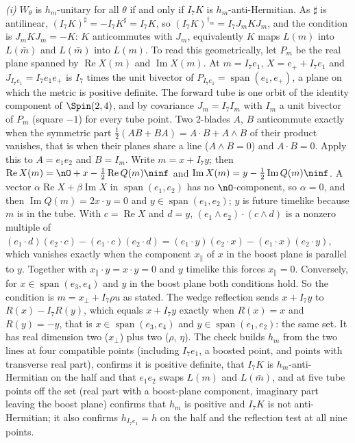 \emph{(i)} $W_{\theta}$ is $h_{m}$-unitary for all $\theta$ if and only if $I_{7}K$ is $h_{m}$-anti-Hermitian. As $\sharp$ is antilinear, $(I_{7}K)^{\sharp} = -I_{7}K^{\sharp} = I_{7}K$, so $(I_{7}K)^{\dagger_{m}} = I_{7}J_{m}KJ_{m}$, and the condition is $J_{m}KJ_{m} = -K$: $K$ anticommutes with $J_{m}$, equivalently $K$ maps $L(m)$ into $L(\bar m)$ and $L(\bar m)$ into $L(m)$.
To read this geometrically, let $P_{m}$ be the real plane spanned by $\operatorname{Re}X(m)$ and $\operatorname{Im}X(m)$. At $m = I_{7}e_{1}$, $X = e_{+} + I_{7}e_{1}$ and $J_{I_{7}e_{1}} = I_{7}e_{1}e_{+}$ is $I_{7}$ times the unit bivector of $P_{I_{7}e_{1}} = \operatorname{span}(e_{1}, e_{+})$, a plane on which the metric is positive definite. The forward tube is one orbit of the identity component of $\Spin(2,4)$, and by covariance $J_{m} = I_{7}I_{m}$ with $I_{m}$ a unit bivector of $P_{m}$ (square $-1$) for every tube point. Two 2-blades $A$, $B$ anticommute exactly when the symmetric part $\tfrac12(AB + BA) = A \cdot B + A \wedge B$ of their product vanishes, that is when their planes share a line ($A \wedge B = 0$) and $A \cdot B = 0$. Apply this to $A = e_{1}e_{2}$ and $B = I_{m}$. Write $m = x + I_{7}y$; then $\operatorname{Re}X(m) = \nO + x - \tfrac12\operatorname{Re}Q(m)\ninf$ and $\operatorname{Im}X(m) = y - \tfrac12\operatorname{Im}Q(m)\ninf$. A vector $\alpha\operatorname{Re}X + \beta\operatorname{Im}X$ in $\operatorname{span}(e_{1}, e_{2})$ has no $\nO$-component, so $\alpha = 0$, and then $\operatorname{Im}Q(m) = 2x \cdot y = 0$ and $y \in \operatorname{span}(e_{1}, e_{2})$; $y$ is future timelike because $m$ is in the tube. With $c = \operatorname{Re}X$ and $d = y$, $(e_{1} \wedge e_{2}) \cdot (c \wedge d)$ is a nonzero multiple of $(e_{1} \cdot d)(e_{2} \cdot c) - (e_{1} \cdot c)(e_{2} \cdot d) = (e_{1} \cdot y)(e_{2} \cdot x) - (e_{1} \cdot x)(e_{2} \cdot y)$, which vanishes exactly when the component $x_{\parallel}$ of $x$ in the boost plane is parallel to $y$. Together with $x_{\parallel} \cdot y = x \cdot y = 0$ and $y$ timelike this forces $x_{\parallel} = 0$. Conversely, for $x \in \operatorname{span}(e_{3}, e_{4})$ and $y$ in the boost plane both conditions hold. So the condition is $m = x_{\perp} + I_{7}\rho u$ as stated. The wedge reflection sends $x + I_{7}y$ to $R(x) - I_{7}R(y)$, which equals $x + I_{7}y$ exactly when $R(x) = x$ and $R(y) = -y$, that is $x \in \operatorname{span}(e_{3}, e_{4})$ and $y \in \operatorname{span}(e_{1}, e_{2})$: the same set. It has real dimension two ($x_{\perp}$) plus two ($\rho$, $\eta$). The check builds $h_{m}$ from the two lines at four compatible points (including $I_{7}e_{1}$, a boosted point, and points with transverse real part), confirms it is positive definite, that $I_{7}K$ is $h_{m}$-anti-Hermitian on the half and that $e_{1}e_{2}$ swaps $L(m)$ and $L(\bar m)$, and at five tube points off the set (real part with a boost-plane component, imaginary part leaving the boost plane) confirms that $h_{m}$ is positive and $I_{7}K$ is not anti-Hermitian; it also confirms $h_{I_{7}e_{1}} = h$ on the half and the reflection test at all nine points.

